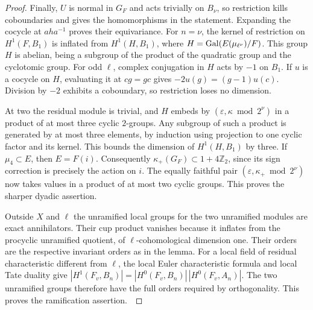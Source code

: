 \documentclass[a4paper,11pt]{article}
\theoremstyle{definition}
\theoremstyle{remark}
\newcommand{\ZZ}{\mathbb Z}\newcommand{\ord}{\operatorname{ord}}
\numberwithin{equation}{section}
\begin{document}
\begin{proof}
Finally, \(U\) is normal in \(G_F\) and acts trivially on
\(B_\nu\), so restriction kills coboundaries and gives the
homomorphisms in the statement. Expanding the cocycle at
\(aha^{-1}\) proves their equivariance. For \(n=\nu\), the
kernel of restriction on \(H^1(F,B_1)\) is inflated from
\(H^1(H,B_1)\), where \(H=\operatorname{Gal}(E(\mu_{\ell^\nu})/F)\).
This group \(H\) is abelian, being a subgroup of the product
of the quadratic group and the cyclotomic group. For odd
\(\ell\), complex conjugation in \(H\) acts by \(-1\) on
\(B_1\). If \(u\) is a cocycle on \(H\), evaluating it at
\(cg=gc\) gives \(-2u(g)=(g-1)u(c)\). Division by \(-2\)
exhibits a coboundary, so restriction loses no dimension.

At two the residual module is trivial, and \(H\) embeds by
\((\varepsilon,\kappa\bmod 2^\nu)\) in a product of at most
three cyclic \(2\)-groups. Any subgroup of such a product
is generated by at most three elements, by induction using
projection to one cyclic factor and its kernel. This bounds
the dimension of \(H^1(H,B_1)\) by three. If \(\mu_4\subset E\),
then \(E=F(i)\). Consequently \(\kappa_+(G_F)\subset1+4\ZZ_2\),
since its sign correction is precisely the action on \(i\).
The equally faithful pair
\((\varepsilon,\kappa_+\bmod 2^\nu)\) now takes values in
a product of at most two cyclic groups. This proves the
sharper dyadic assertion.

Outside \(X\) and \(\ell\) the unramified local groups for the
two unramified modules are exact annihilators. Their cup product
vanishes because it inflates from the procyclic unramified
quotient, of \(\ell\)-cohomological dimension one. Their orders
are the respective invariant orders as in the lemma. For a
local field of residual characteristic different from \(\ell\),
the local Euler characteristic formula and local Tate duality
give \(|H^1(F_v,B_n)|=|H^0(F_v,B_n)|\,|H^0(F_v,A_n)|\).
The two unramified groups therefore have the full orders
required by orthogonality. This proves the ramification
assertion.~\cite{II-II-II-duality13}
\end{proof}
\end{document}
